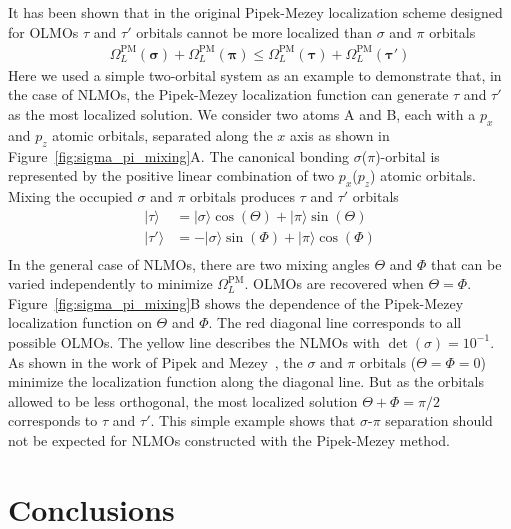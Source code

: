 \documentclass[aps,prl,reprint,amsmath,amssymb]{revtex4-1}
\newcommand{\ket}[1]{\ensuremath{\vert #1 \rangle}}
\begin{document}
It has been shown that in the original Pipek-Mezey localization scheme designed for OLMOs $\tau$ and $\tau'$ orbitals cannot be more localized than $\sigma$ and $\pi$ orbitals~\cite{pipek1989fast}
%
\begin{equation} \label{eq:OLMO-pipek}
\begin{split}
\Omega_L^{\text{PM}}(\mathbf{\sigma}) + \Omega_L^{\text{PM}}(\mathbf{\pi}) \leqslant \Omega_L^{\text{PM}}(\mathbf{\tau}) + \Omega_L^{\text{PM}}(\mathbf{\tau'})
\end{split}
\end{equation}
%
Here we used a simple two-orbital system as an example to demonstrate that, in the case of NLMOs, the Pipek-Mezey localization function can generate $\tau$ and $\tau'$ as the most localized solution. 
We consider two atoms A and B, each with a $p_x$ and $p_z$ atomic orbitals, separated along the $x$ axis as shown in Figure~\ref{fig:sigma_pi_mixing}A.
The canonical bonding $\sigma$($\pi$)-orbital is represented by the positive linear combination of two $p_x$($p_z$) atomic orbitals. 
Mixing the occupied $\sigma$ and $\pi$ orbitals produces $\tau$ and $\tau'$ orbitals
%
\begin{equation} \label{eq:tao-pipek}
\begin{split}
\ket{\tau} &= \ket{\sigma}\cos(\Theta) + \ket{\pi} \sin(\Theta)\\
\ket{\tau'} &= - \ket{\sigma} \sin(\Phi) + \ket{\pi} \cos(\Phi) \\
\end{split}
\end{equation}
%
In the general case of NLMOs, there are two mixing angles $\Theta$ and $\Phi$ that can be varied independently to minimize $\Omega^{\text{PM}}_L$. OLMOs are recovered when $\Theta = \Phi$. 
Figure~\ref{fig:sigma_pi_mixing}B shows the dependence of the Pipek-Mezey localization function on $\Theta$ and $\Phi$. 
The red diagonal line corresponds to all possible OLMOs. The yellow line describes the NLMOs with $\det(\sigma) = 10^{-1}$. 
As shown in the work of Pipek and Mezey~\cite{pipek1989fast}, the $\sigma$ and $\pi$ orbitals ($\Theta=\Phi=0$) minimize the localization function along the diagonal line. 
But as the orbitals allowed to be less orthogonal, the most localized solution $\Theta+\Phi=\pi/2$ corresponds to $\tau$ and $\tau'$. 
This simple example shows that $\sigma$-$\pi$ separation should not be expected for NLMOs constructed with the Pipek-Mezey method.

\section{Conclusions}
\end{document}
